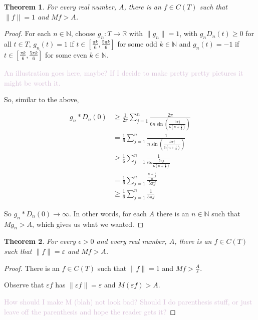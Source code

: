 \documentclass{amsart}
\newcommand{\ep}{\epsilon}
\newcommand{\vep}{\varepsilon}
\newcommand{\N}{\mathbb{N}}
\newcommand{\R}{\mathbb{R}}
\newcommand{\colorcomment}[2]{\textcolor{#1}{#2}} %
\newcommand{\norm}[1]{\|#1\|}
\newtheorem{thm}{Theorem}[section]
\theoremstyle{definition}
\begin{document}
\begin{thm}
For every real number, $A$, there is an $f \in C(T)$ such that $\norm{f} = 1$ and $Mf > A$. 
\end{thm}

\begin{proof}
For each $n \in \N$, choose $g_n: T \to \R$ with $\norm{g_n} = 1$, with $g_nD_n(t) \geq 0$ for all $t \in T$,  $g_n(t) = 1$ if $t \in [\frac{\pi k}{6},\frac{5 \pi k}{6}]$ for some odd $k \in \N$  and $g_n(t) = -1$ if $t \in [\frac{\pi k}{6},\frac{5 \pi k}{6}]$ for some even $k \in \N$.

\colorcomment{Thistle}{An illustration goes here, maybe? If I decide to make pretty pretty pictures it might be worth it.}

So, similar to the above,

\begin{align*}
g_n \ast D_n(0) &\geq \frac{1}{2 \pi} \sum\limits_{j=1}^n \frac{2 \pi}{6n \sin(\frac{5\pi j}{6(n+\frac{1}{2})})}\\
&= \frac{1}{6} \sum\limits_{j=1}^n \frac{1}{n \sin(\frac{5\pi j}{6(n+\frac{1}{2})})}\\
&\geq \frac{1}{6} \sum\limits_{j=1}^n \frac{1}{6n \frac{5\pi j}{6(n+\frac{1}{2})}}\\
&= \frac{1}{6} \sum\limits_{j=1}^n \frac{\frac{n+\frac{1}{2}}{n}}{5\pi j}\\
&\geq \frac{1}{6} \sum\limits_{j=1}^n \frac{1}{5\pi j}
\end{align*}

So $g_n \ast D_n(0) \to \infty$. In other words, for each $A$ there is an $n \in \N$ such that $Mg_n > A$, which gives us what we wanted.

\end{proof}

\begin{thm}
For every $\ep >0$ and every real number, $A$, there is an $f \in C(T)$ such that $\norm{f} = \vep $ and $Mf > A$. 

\end{thm}

\begin{proof}
There is an $f \in C(T)$ such that $\norm{f} = 1$ and $Mf > \frac{A}{\vep}$.

Observe that $\vep f$ has $\norm{\vep f} = \vep$ and $M(\vep f) > A$.

\colorcomment{Thistle}{How should I make M (blah) not look bad? Should I do parenthesis stuff, or just leave off the parenthesis and hope the reader gets it?}
\end{proof}
\end{document}
